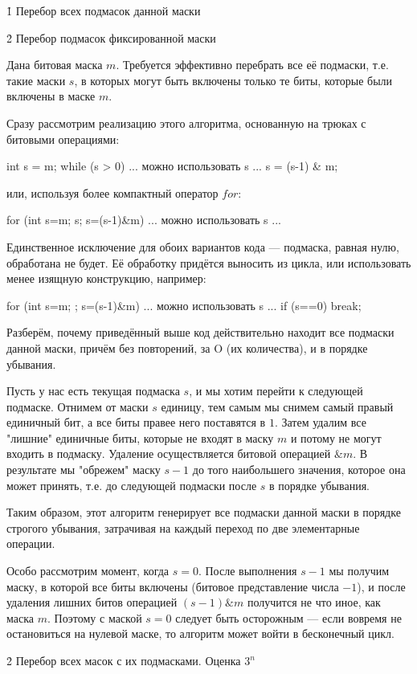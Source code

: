 \h1{ Перебор всех подмасок данной маски }


\h2{ Перебор подмасок фиксированной маски }

Дана битовая маска $m$. Требуется эффективно перебрать все её подмаски, т.е. такие маски $s$, в которых могут быть включены только те биты, которые были включены в маске $m$.

Сразу рассмотрим реализацию этого алгоритма, основанную на трюках с битовыми операциями:

\code
int s = m;
while (s > 0) {
	... можно использовать s ...
	s = (s-1) & m;
}
\endcode

или, используя более компактный оператор $for$:

\code
for (int s=m; s; s=(s-1)&m)
	... можно использовать s ...
\endcode

Единственное исключение для обоих вариантов кода --- подмаска, равная нулю, обработана не будет. Её обработку придётся выносить из цикла, или использовать менее изящную конструкцию, например:

\code
for (int s=m; ; s=(s-1)&m) {
	... можно использовать s ...
	if (s==0)  break;
}
\endcode

Разберём, почему приведённый выше код действительно находит все подмаски данной маски, причём без повторений, за O (их количества), и в порядке убывания.

Пусть у нас есть текущая подмаска $s$, и мы хотим перейти к следующей подмаске. Отнимем от маски $s$ единицу, тем самым мы снимем самый правый единичный бит, а все биты правее него поставятся в $1$. Затем удалим все "лишние" единичные биты, которые не входят в маску $m$ и потому не могут входить в подмаску. Удаление осуществляется битовой операцией $\& m$. В результате мы "обрежем" маску $s-1$ до того наибольшего значения, которое она может принять, т.е. до следующей подмаски после $s$ в порядке убывания.

Таким образом, этот алгоритм генерирует все подмаски данной маски в порядке строгого убывания, затрачивая на каждый переход по две элементарные операции.

Особо рассмотрим момент, когда $s = 0$. После выполнения $s-1$ мы получим маску, в которой все биты включены (битовое представление числа $-1$), и после удаления лишних битов операцией $(s-1) \& m$ получится не что иное, как маска $m$. Поэтому с маской $s = 0$ следует быть осторожным --- если вовремя не остановиться на нулевой маске, то алгоритм может войти в бесконечный цикл.


\h2{ Перебор всех масок с их подмасками. Оценка $3^n$ }

